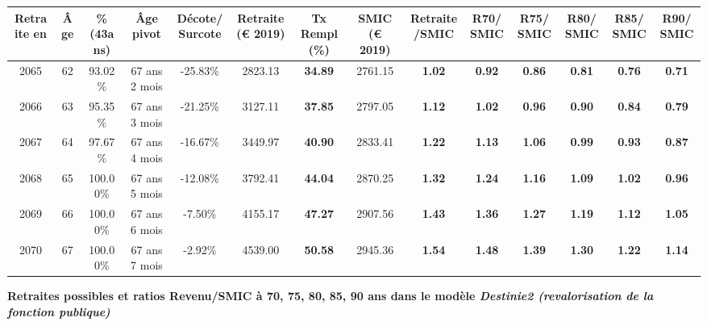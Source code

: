 \begin{adjustbox}{max width=\textwidth} 
\begin{tabular}[htb]{|c|c||c|c|c||c|c||c|c||c|c|c|c|c|} 
\hline 
 Retraite en &  Âge &  \%(43ans) &  Âge pivot &  Décote/Surcote &  Retraite (\euro{} 2019) &  Tx Rempl(\%) &  SMIC (\euro{} 2019) &  Retraite/SMIC &  R70/SMIC &  R75/SMIC &  R80/SMIC &  R85/SMIC &  R90/SMIC \\ 
\hline \hline 
 2065 &  62 &  93.02\% &  67 ans 2 mois &  -25.83\% &  2823.13 &  {\bf 34.89} &  2761.15 &  {\bf 1.02} &  {\bf {\color{red} 0.92}} &  {\bf {\color{red} 0.86}} &  {\bf {\color{red} 0.81}} &  {\bf {\color{red} 0.76}} &  {\bf {\color{red} 0.71}} \\ 
\hline 
 2066 &  63 &  95.35\% &  67 ans 3 mois &  -21.25\% &  3127.11 &  {\bf 37.85} &  2797.05 &  {\bf 1.12} &  {\bf 1.02} &  {\bf {\color{red} 0.96}} &  {\bf {\color{red} 0.90}} &  {\bf {\color{red} 0.84}} &  {\bf {\color{red} 0.79}} \\ 
\hline 
 2067 &  64 &  97.67\% &  67 ans 4 mois &  -16.67\% &  3449.97 &  {\bf 40.90} &  2833.41 &  {\bf 1.22} &  {\bf 1.13} &  {\bf 1.06} &  {\bf {\color{red} 0.99}} &  {\bf {\color{red} 0.93}} &  {\bf {\color{red} 0.87}} \\ 
\hline 
 2068 &  65 &  100.00\% &  67 ans 5 mois &  -12.08\% &  3792.41 &  {\bf 44.04} &  2870.25 &  {\bf 1.32} &  {\bf 1.24} &  {\bf 1.16} &  {\bf 1.09} &  {\bf 1.02} &  {\bf {\color{red} 0.96}} \\ 
\hline 
 2069 &  66 &  100.00\% &  67 ans 6 mois &  -7.50\% &  4155.17 &  {\bf 47.27} &  2907.56 &  {\bf 1.43} &  {\bf 1.36} &  {\bf 1.27} &  {\bf 1.19} &  {\bf 1.12} &  {\bf 1.05} \\ 
\hline 
 2070 &  67 &  100.00\% &  67 ans 7 mois &  -2.92\% &  4539.00 &  {\bf 50.58} &  2945.36 &  {\bf 1.54} &  {\bf 1.48} &  {\bf 1.39} &  {\bf 1.30} &  {\bf 1.22} &  {\bf 1.14} \\ 
\hline 
\hline 
\end{tabular} 
\end{adjustbox} 
 
 \vspace{0.1cm} 
{\bf \noindent Retraites possibles et ratios Revenu/SMIC à 70, 75, 80, 85, 90 ans dans le modèle \emph{Destinie2 (revalorisation de la fonction publique)}}  
 
